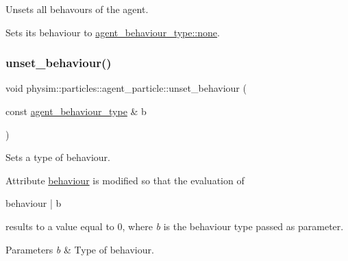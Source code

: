 Unsets all behavours of the agent. 

Sets its behaviour to \hyperlink{namespacephysim_1_1particles_a033757595f7862a0fc8a389d79bf9c88a334c4a4c42fdb79d7ebc3e73b517e6f8}{agent\+\_\+behaviour\+\_\+type\+::none}. \mbox{\label{classphysim_1_1particles_1_1agent__particle_a903f5a9d1c34eed73dd5286e55e41b3d}} 
\subsubsection{\texorpdfstring{unset\+\_\+behaviour()}{unset\_behaviour()}}
{\footnotesize\ttfamily void physim\+::particles\+::agent\+\_\+particle\+::unset\+\_\+behaviour (\begin{DoxyParamCaption}\item[{const \hyperlink{namespacephysim_1_1particles_a033757595f7862a0fc8a389d79bf9c88}{agent\+\_\+behaviour\+\_\+type} \&}]{b }\end{DoxyParamCaption})}



Sets a type of behaviour. 

Attribute \hyperlink{classphysim_1_1particles_1_1agent__particle_af219e3f46630bb7f51f3d00952ed4f1c}{behaviour} is modified so that the evaluation of \begin{DoxyVerb}behaviour | b
\end{DoxyVerb}
 results to a value equal to 0, where {\itshape b} is the behaviour type passed as parameter. 
\begin{DoxyParams}{Parameters}
{\em b} & Type of behaviour. \\
\hline
\end{DoxyParams}
\mbox{\label{classphysim_1_1particles_1_1agent__particle_ad86911b0dfbcebf64700ee4bacc86763}} 
